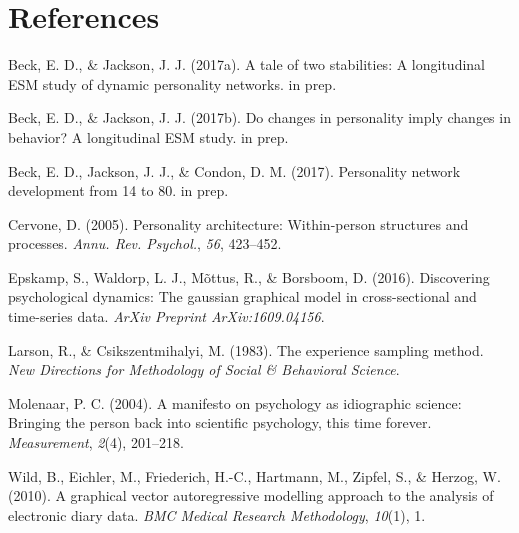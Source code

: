 \documentclass[english,floatsintext,man]{apa6}
\theoremstyle{definition}
\theoremstyle{definition}
\theoremstyle{remark}
\begin{document}
\newpage

\section{References}\label{references}

\setlength{\parindent}{-0.5in} \setlength{\leftskip}{0.5in}

\hypertarget{refs}{}
\hypertarget{ref-BeckJackson}{}
Beck, E. D., \& Jackson, J. J. (2017a). A tale of two stabilities: A
longitudinal ESM study of dynamic personality networks. in prep.

\hypertarget{ref-BeckJacksonCorrChange}{}
Beck, E. D., \& Jackson, J. J. (2017b). Do changes in personality imply
changes in behavior? A longitudinal ESM study. in prep.

\hypertarget{ref-BeckJacksonCondonFull}{}
Beck, E. D., Jackson, J. J., \& Condon, D. M. (2017). Personality
network development from 14 to 80. in prep.

\hypertarget{ref-cervone_2005}{}
Cervone, D. (2005). Personality architecture: Within-person structures
and processes. \emph{Annu. Rev. Psychol.}, \emph{56}, 423--452.

\hypertarget{ref-epskamp_2017}{}
Epskamp, S., Waldorp, L. J., Mõttus, R., \& Borsboom, D. (2016).
Discovering psychological dynamics: The gaussian graphical model in
cross-sectional and time-series data. \emph{ArXiv Preprint
ArXiv:1609.04156}.

\hypertarget{ref-larson1983experience}{}
Larson, R., \& Csikszentmihalyi, M. (1983). The experience sampling
method. \emph{New Directions for Methodology of Social \& Behavioral
Science}.

\hypertarget{ref-molenaar_2004}{}
Molenaar, P. C. (2004). A manifesto on psychology as idiographic
science: Bringing the person back into scientific psychology, this time
forever. \emph{Measurement}, \emph{2}(4), 201--218.

\hypertarget{ref-wild_2010}{}
Wild, B., Eichler, M., Friederich, H.-C., Hartmann, M., Zipfel, S., \&
Herzog, W. (2010). A graphical vector autoregressive modelling approach
to the analysis of electronic diary data. \emph{BMC Medical Research
Methodology}, \emph{10}(1), 1.
\end{document}
